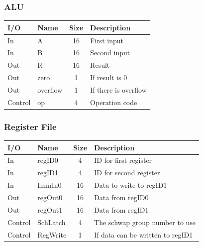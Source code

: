 \documentclass{article}
\begin{document}
		\subsubsection{ALU}
			\begin{center} \begin{tabular}{| l | l | c | l |} \hline 
				I/O & Name     & Size & Description \\ \hline 
				In  & A        & 16   & First input \\ \hline
				In  & B        & 16   & Second input \\ \hline
				Out & R        & 16   & Result \\ \hline
				Out & zero     & 1    & If result is 0 \\ \hline
				Out & overflow & 1    & If there is overflow \\ \hline
				Control & op   & 4    & Operation code \\ \hline
			\end{tabular} \end{center}
		\subsubsection{Register File}
			\begin{center} \begin{tabular}{| l | l | c | l |} \hline
				I/O & Name       & Size & Description \\ \hline 
				In  & regID0     & 4    & ID for first register \\ \hline
				In  & regID1     & 4    & ID for second register \\ \hline
				In  & ImmIn0     & 16   & Data to write to regID1 \\ \hline
				Out & regOut0    & 16   & Data from regID0 \\ \hline
				Out & regOut1    & 16   & Data from regID1 \\ \hline
				Control & SchLatch & 4  & The schwap group number to use\\ \hline
				Control & RegWrite & 1  & If data can be written to regID1\\ \hline
			\end{tabular} \end{center}
\end{document}
